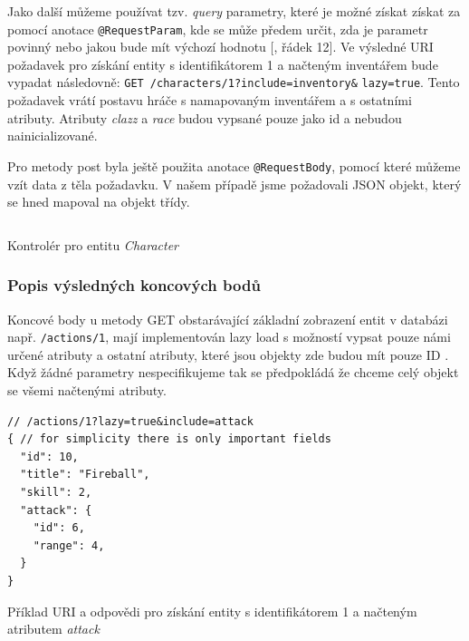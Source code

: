 Jako další můžeme používat tzv. \textit{query} parametry, které je možné získat získat za pomocí anotace \texttt{@RequestParam}, kde se může předem určit, zda je parametr povinný nebo jakou bude mít výchozí hodnotu [, řádek 12]. Ve výsledné URI požadavek pro získání entity s identifikátorem 1 a načteným inventářem bude vypadat následovně: \texttt{GET /characters/1?include=inventory\&} \texttt{lazy=true}. Tento požadavek vrátí postavu hráče s namapovaným inventářem a s ostatními atributy. Atributy \textit{clazz} a \textit{race} 
budou vypsané pouze jako id a nebudou nainicializované.

Pro metody post byla ještě použita anotace \texttt{@RequestBody}, pomocí které můžeme vzít data z těla požadavku. V našem případě jsme požadovali JSON objekt, který se hned mapoval na objekt třídy.

\begin{listing}[h!]
    \inputminted[]{Java}{resources/code/impl/CharacterController.java}
    \caption{Kontrolér pro entitu \textit{Character}}
    \label{code:characterController}
\end{listing}

\subsubsection*{Popis výsledných koncových bodů}\label{sec:impl:endpoints:desc}   %
Koncové body u metody GET obstarávající základní zobrazení entit v databázi např. \texttt{/actions/1}, mají implementován lazy load  s možností vypsat pouze námi určené atributy a ostatní atributy, které jsou objekty zde budou mít pouze ID . Když žádné parametry nespecifikujeme tak se předpokládá že chceme celý objekt se všemi načtenými atributy.

\begin{listing}[H]
    \begin{verbatim}
// /actions/1?lazy=true&include=attack 
{ // for simplicity there is only important fields
  "id": 10,
  "title": "Fireball",
  "skill": 2,
  "attack": {
    "id": 6,
    "range": 4,
  }
}
    \end{verbatim}
    \caption{Příklad URI a odpovědi pro získání entity s identifikátorem 1 a načteným atributem \textit{attack}}
    \label{code:action:endpoint:single}
\end{listing}

